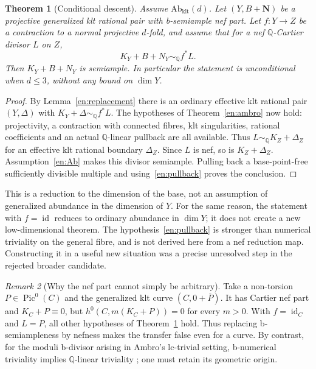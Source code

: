 \documentclass[12pt]{amsart}
\newtheorem{thm}{Theorem}[section]
\theoremstyle{definition}
\theoremstyle{remark}
\newtheorem{rem}[thm]{Remark}
\numberwithin{equation}{section}
\DeclareMathOperator{\id}{id}
\newcommand{\Q}{\mathbb{Q}}
\DeclareMathOperator{\Pic}{Pic}
\newcommand{\bN}{\mathbf N}
\newcommand{\qs}{\sim_{\mathbb Q}}
\begin{document}
\begin{thm}[Conditional descent]\label{en:transfer}
Assume $\mathrm{Ab}_{\mathrm{klt}}(d)$. Let $(Y,B+\bN)$ be a projective generalized klt rational pair with b-semiample nef part. Let $f:Y\to Z$ be a contraction to a normal projective $d$-fold, and assume that for a nef $\Q$-Cartier divisor $L$ on $Z$,
\begin{equation}\label{en:pullback}
 K_Y+B+N_Y\qs f^*L.
\end{equation}
Then $K_Y+B+N_Y$ is semiample. In particular the statement is unconditional when $d\leq3$, without any bound on $\dim Y$.
\end{thm}
\begin{proof}
By Lemma~\ref{en:replacement} there is an ordinary effective klt rational pair $(Y,\Delta)$ with $K_Y+\Delta\qs f^*L$. The hypotheses of Theorem~\ref{en:ambro} now hold: projectivity, a contraction with connected fibres, klt singularities, rational coefficients and an actual $\Q$-linear pullback are all available. Thus $L\qs K_Z+\Delta_Z$ for an effective klt rational boundary $\Delta_Z$. Since $L$ is nef, so is $K_Z+\Delta_Z$. Assumption~\ref{en:Ab} makes this divisor semiample. Pulling back a base-point-free sufficiently divisible multiple and using~\eqref{en:pullback} proves the conclusion.
\end{proof}

This is a reduction to the dimension of the base, not an assumption of generalized abundance in the dimension of $Y$. For the same reason, the statement with $f=\id$ reduces to ordinary abundance in $\dim Y$; it does not create a new low-dimensional theorem. The hypothesis~\eqref{en:pullback} is stronger than numerical triviality on the general fibre, and is not derived here from a nef reduction map. Constructing it in a useful new situation was a precise unresolved step in the rejected broader candidate.

\begin{rem}[Why the nef part cannot simply be arbitrary]\label{en:badreplace}
Take a non-torsion $P\in\Pic^0(C)$ and the generalized klt curve $(C,0+\overline P)$. It has Cartier nef part and $K_C+P\equiv0$, but $h^0(C,m(K_C+P))=0$ for every $m>0$. With $f=\id_C$ and $L=P$, all other hypotheses of Theorem~\ref{en:transfer} hold. Thus replacing b-semiampleness by nefness makes the transfer false even for a curve. By contrast, for the moduli b-divisor arising in Ambro's lc-trivial setting, b-numerical triviality implies $\Q$-linear triviality \cite[Theorem 3.5]{en-Amb}; one must retain its geometric origin.
\end{rem}
\end{document}
